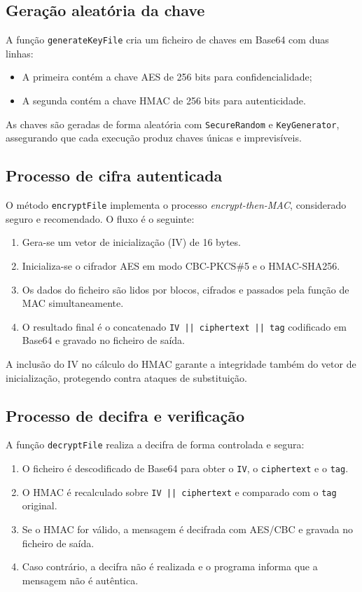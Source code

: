 \subsection{Geração aleatória da chave}

A função \texttt{generateKeyFile} cria um ficheiro de chaves em Base64 com duas linhas:
\begin{itemize}
    \item A primeira contém a chave AES de 256 bits para confidencialidade;
    \item A segunda contém a chave HMAC de 256 bits para autenticidade.
\end{itemize}

As chaves são geradas de forma aleatória com \texttt{SecureRandom} e \texttt{KeyGenerator}, assegurando que cada execução produz chaves únicas e imprevisíveis.


\subsection{Processo de cifra autenticada}

O método \texttt{encryptFile} implementa o processo \textit{encrypt-then-MAC}, considerado seguro e recomendado. O fluxo é o seguinte:
\begin{enumerate}
    \item Gera-se um vetor de inicialização (IV) de 16 bytes.
    \item Inicializa-se o cifrador AES em modo CBC-PKCS\#5 e o HMAC-SHA256.
    \item Os dados do ficheiro são lidos por blocos, cifrados e passados pela função de MAC simultaneamente.
    \item O resultado final é o concatenado \texttt{IV || ciphertext || tag} codificado em Base64 e gravado no ficheiro de saída.
\end{enumerate}

A inclusão do IV no cálculo do HMAC garante a integridade também do vetor de inicialização, protegendo contra ataques de substituição.


\subsection{Processo de decifra e verificação}

A função \texttt{decryptFile} realiza a decifra de forma controlada e segura:
\begin{enumerate}
    \item O ficheiro é descodificado de Base64 para obter o \texttt{IV}, o \texttt{ciphertext} e o \texttt{tag}.
    \item O HMAC é recalculado sobre \texttt{IV || ciphertext} e comparado com o \texttt{tag} original.
    \item Se o HMAC for válido, a mensagem é decifrada com AES/CBC e gravada no ficheiro de saída.
    \item Caso contrário, a decifra não é realizada e o programa informa que a mensagem não é autêntica.
\end{enumerate}

